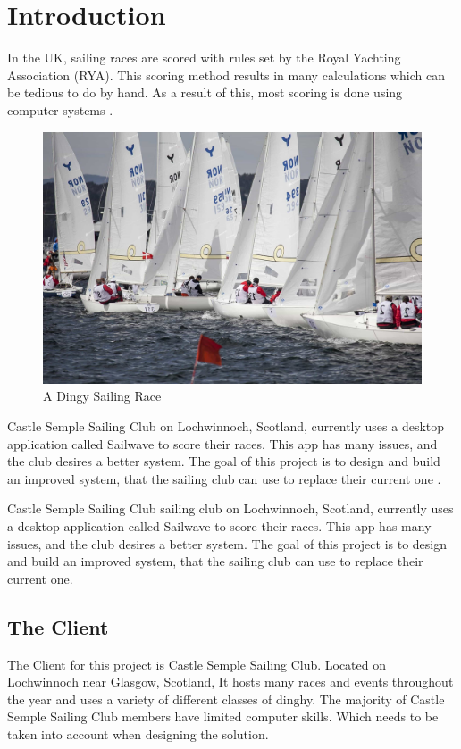 \documentclass{l4proj}
\begin{document}
\chapter{Introduction}


In the UK, sailing races are scored with rules set by the Royal Yachting Association (RYA).
This scoring method results in many calculations which can be tedious to do by hand. As a result of this, most scoring is done using computer systems \citep{RYAscore}.

\begin{figure}[h!]
    \centering
    \includegraphics[width=0.6\linewidth]{images/SailingRace.jpg} 

    \caption{A Dingy Sailing Race \citep{SailingRace}
    }

    \label{fig:SailingRace} 
\end{figure}

Castle Semple Sailing Club on Lochwinnoch, Scotland, currently uses a desktop application called Sailwave to score their races. This app has many issues, and the club desires a better system. The goal of this project is to design and build an improved system, that the sailing club can use to replace their current one \citep{RYAscore}.

Castle Semple Sailing Club sailing club on Lochwinnoch, Scotland, currently uses a desktop application called Sailwave to score their races. This app has many issues, and the club desires a better system. The goal of this project is to design and build an improved system, that the sailing club can use to replace their current one.

\section{The Client}
The Client for this project is Castle Semple Sailing Club. Located on Lochwinnoch near Glasgow, Scotland, It hosts many races and events throughout the year and uses a variety of different classes of dinghy. The majority of Castle Semple Sailing Club members have limited computer skills. Which needs to be taken into account when designing the solution.
\end{document}

